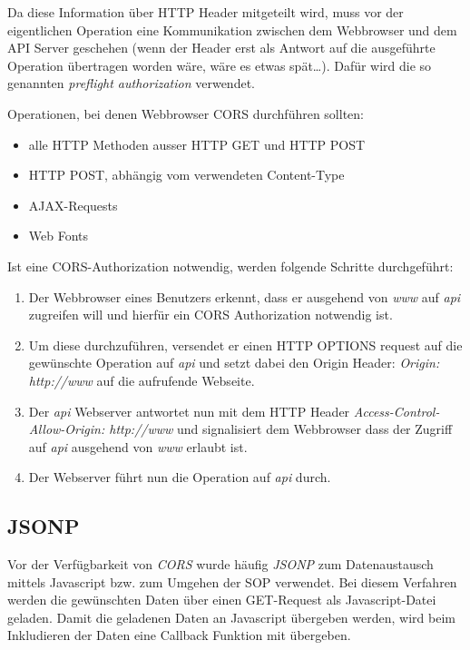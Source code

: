 Da diese Information über HTTP Header mitgeteilt wird, muss vor der eigentlichen Operation eine Kommunikation zwischen dem Webbrowser und dem API Server geschehen (wenn der Header erst als Antwort auf die ausgeführte Operation übertragen worden wäre, wäre es etwas spät\ldots). Dafür wird die so genannten \textit{preflight authorization} verwendet.

Operationen, bei denen Webbrowser CORS durchführen sollten:

\begin{itemize}
	\item alle HTTP Methoden ausser HTTP GET und HTTP POST
	\item HTTP POST, abhängig vom verwendeten Content-Type
	\item AJAX-Requests
	\item Web Fonts
\end{itemize}

Ist eine CORS-Authorization notwendig, werden folgende Schritte durchgeführt:

\begin{enumerate}
	\item Der Webbrowser eines Benutzers erkennt, dass er ausgehend von \textit{www} auf \textit{api} zugreifen will und hierfür ein CORS Authorization notwendig ist.
	\item Um diese durchzuführen, versendet er einen HTTP OPTIONS request auf die gewünschte Operation auf \textit{api} und setzt dabei den Origin Header: \textit{Origin: http://www} auf die aufrufende Webseite.
	\item Der \textit{api} Webserver antwortet nun mit dem HTTP Header \textit{Access-Control-Allow-Origin: http://www} und signalisiert dem Webbrowser dass der Zugriff auf \textit{api} ausgehend von \textit{www} erlaubt ist.
	\item Der Webserver führt nun die Operation auf \textit{api} durch.
\end{enumerate}

\subsection{JSONP}

Vor der Verfügbarkeit von \textit{CORS} wurde häufig \textit{JSONP} zum Datenaustausch mittels Javascript bzw. zum Umgehen der SOP verwendet. Bei diesem Verfahren werden die gewünschten Daten über einen GET-Request als Javascript-Datei geladen. Damit die geladenen Daten an Javascript übergeben werden, wird beim Inkludieren der Daten eine Callback Funktion mit übergeben.

